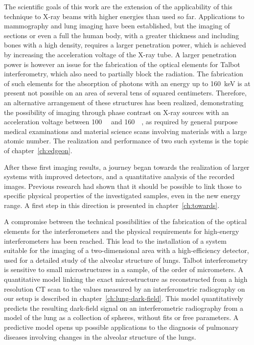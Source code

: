 The scientific goals of this work are the extension of the applicability of
this technique to X-ray beams with higher energies than used so far.
Applications to mammography and lung imaging have been established, but
the imaging of sections or even a full the human body, with a greater thickness
and including bones with a high density, requires a larger penetration
power, which is achieved by increasing the acceleration voltage of the X-ray
tube. A larger penetration power is however an issue for the fabrication of
the optical elements for Talbot interferometry, which also need to partially block the
radiation. The fabrication of such elements for the
absorption of photons with an energy up to \SI{160}{\kilo\eV} is at present
not possible on an area of several tens of squared centimeters. Therefore,
an alternative arrangement of these structures has been realized, demonstrating
the possibility of imaging through phase contrast on X-ray sources with an
acceleration voltage between \SI{100}{\kilo\voltpeak} and
\SI{160}{\kilo\voltpeak}, as required by general purpose medical
examinations and material science scans involving materials with a large
atomic number. The realization and performance of two such systems is the
topic of chapter~\ref{ch:edgeon}.

After these first imaging results, a journey began towards
 the realization of larger systems with improved detectors, 
and a quantitative analysis of the recorded images. Previous research
had shown that it should be possible to link those to specific physical
properties of the investigated samples, even in the new energy range. A first step
in this direction is presented in chapter~\ref{ch:towards}.

A compromise between the technical possibilities of the
fabrication of the optical elements for the interferometers and the physical
requirements for high-energy interferometers has been reached.
This lead to the installation of a system suitable for the imaging of a two-dimensional
area with a high-efficiency detector, used for a detailed
study of the alveolar structure of lungs. Talbot interferometry is sensitive to
small microstructures in a sample, of the order of micrometers. A
quantitative model linking the exact microstructure as reconstructed from a
high resolution \ac{CT} scan to the values measured by an interferometric
radiography on our setup is described in chapter~\ref{ch:lung-dark-field}.
This model quantitatively predicts the resulting dark-field signal on an
interferometric radiography from a model of the lung as a collection of
spheres, without fits or free parameters. A predictive model opens up
possible applications to the diagnosis of pulmonary diseases involving
changes in the alveolar structure of the lungs.


